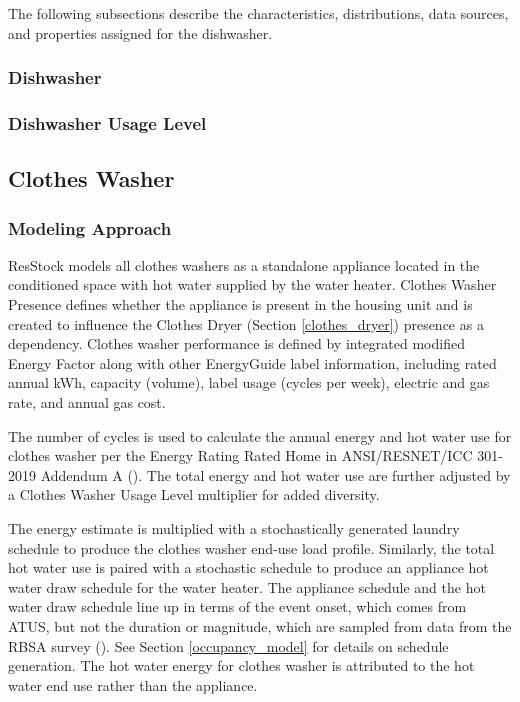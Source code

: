 The following subsections describe the characteristics, distributions, data sources, and properties assigned for the dishwasher.

\subsubsection{Dishwasher}


\subsubsection{Dishwasher Usage Level}\label{dishwasher_usage_level}


\subsection{Clothes Washer}
\subsubsection{Modeling Approach}
ResStock models all clothes washers as a standalone appliance located in the conditioned space with hot water supplied by the water heater. Clothes Washer Presence defines whether the appliance is present in the housing unit and is created to influence the Clothes Dryer (Section \ref{clothes_dryer}) presence as a dependency. Clothes washer performance is defined by integrated modified Energy Factor along with other EnergyGuide label information, including rated annual kWh, capacity (volume), label usage (cycles per week), electric and gas rate, and annual gas cost.

The number of cycles is used to calculate the annual energy and hot water use for clothes washer per the Energy Rating Rated Home in ANSI/RESNET/ICC 301-2019 Addendum A (\cite{ansi_resnet_301_2019}). The total energy and hot water use are further adjusted by a Clothes Washer Usage Level multiplier for added diversity.

The energy estimate is multiplied with a stochastically generated laundry schedule to produce the clothes washer end-use load profile. Similarly, the total hot water use is paired with a stochastic schedule to produce an appliance hot water draw schedule for the water heater. The appliance schedule and the hot water draw schedule line up in terms of the event onset, which comes from ATUS, but not the duration or magnitude, which are sampled from data from the RBSA survey (\cite{RBSA}). See Section \ref{occupancy_model} for details on schedule generation. The hot water energy for clothes washer is attributed to the hot water end use rather than the appliance.

